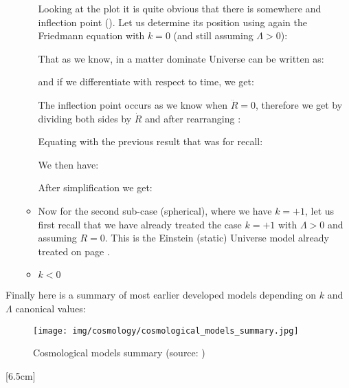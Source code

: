 \begin{itemize}
\begin{itemize}
				Looking at the plot it is quite obvious that there is somewhere and inflection point (). Let us determine its position using again the Friedmann equation with $k=0$ (and still assuming $\Lambda>0$):
				
				That as we know, in a matter dominate Universe can be written as:
				
				and if we differentiate with respect to time, we get:
				
				The inflection point occurs as we know when $\ddot{R}=0$, therefore we get by dividing both sides by $\dot{R}$ and after rearranging :
				
				Equating with the previous result that was for recall:
				
				We then have:
				
				After simplification we get:
				
				
				\item Now for the second sub-case (spherical), where we have $k=+1$, let us first recall that we have already treated the case $k=+1$ with $\Lambda>0$ and assuming $R=0$. This is the Einstein (static) Universe model already treated on page \pageref{einstein static universe model}.
				
				\item $k<0$
			\end{itemize}
	\end{itemize}
	Finally here is a summary of most earlier developed models depending on $k$ and $\Lambda$ canonical values:
	\begin{figure}[H]
		\centering
		\texttt{[image: img/cosmology/cosmological\_models\_summary.jpg]}
		\caption[Cosmological models summary]{Cosmological models summary (source: \cite{d1992introducing})}
	\end{figure}
	
	[6.5cm]
	
